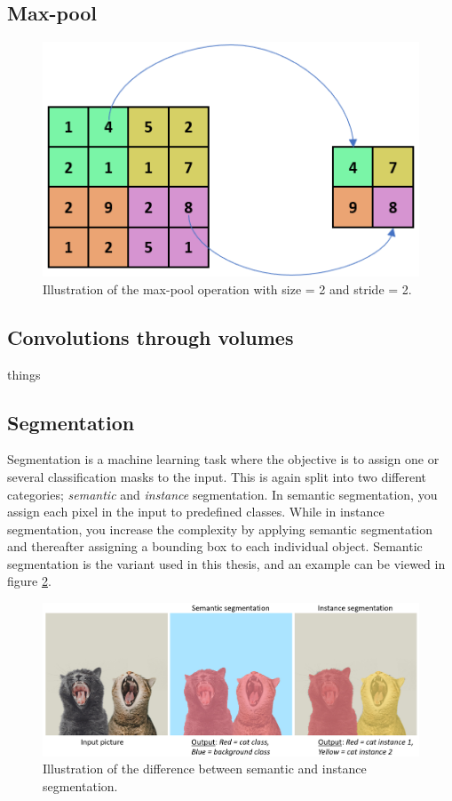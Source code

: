 \subsection{Max-pool}
    \begin{figure}[H]
        \centering
        \includegraphics[scale=0.5]{figures/max_pool.png}
        \caption{Illustration of the max-pool operation with size = 2 and stride = 2.}
      	\medskip 
        \label{maxpool_fig}
    \end{figure}
    
    
\subsection{Convolutions through volumes}
    things
    
\subsection{Segmentation}
    Segmentation is a machine learning task where the objective is to assign one or several classification masks to the input\cite{He_2017_ICCV_segmentation}. This is again split into two different categories; \textit{semantic} and \textit{instance} segmentation. In semantic segmentation, you assign each pixel in the input to predefined classes. While in instance segmentation, you increase the complexity by applying semantic segmentation and thereafter assigning a bounding box to each individual object. Semantic segmentation is the variant used in this thesis, and an example can be viewed in figure \ref{segmentation_fig}.
    
    \begin{figure}[H]
        \centering
        \includegraphics[scale=0.4]{figures/segmentation.png}
        \caption{Illustration of the difference between semantic and instance segmentation.}
      	\medskip 
        \label{segmentation_fig}
    \end{figure}
    
